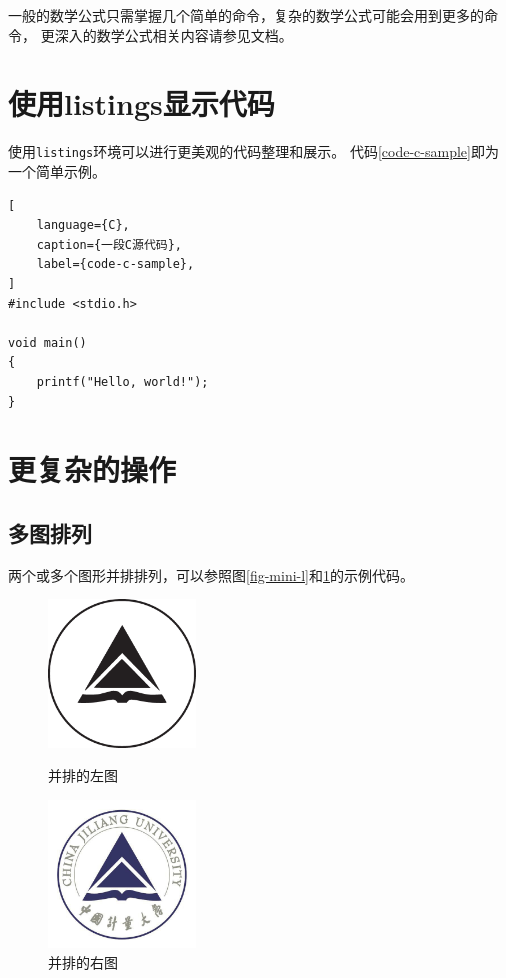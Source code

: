 一般的数学公式只需掌握几个简单的命令，复杂的数学公式可能会用到更多的命令，
更深入的数学公式相关内容请参见文档。

\section{使用listings显示代码}
\label{sec-listings}
使用\texttt{listings}环境可以进行更美观的代码整理和展示。
代码\ref{code-c-sample}即为一个简单示例。
\begin{lstlisting}[
    language={C},
    caption={一段C源代码},
    label={code-c-sample},
]
#include <stdio.h>

void main()
{
    printf("Hello, world!");
}
\end{lstlisting}

\section{更复杂的操作}
\label{sec-more}

\subsection{多图排列}
\label{subsec-multi-fig}
两个或多个图形并排排列，可以参照图\ref{fig-mini-l}和\ref{fig-mini-r}的示例代码。
\begin{figure}[h!] %
    \begin{minipage}{.5\textwidth} %
        \centering
        \includegraphics[width=0.35\textwidth]{preset/figure/logo.eps}
        \caption{并排的左图}
        \label{fig-mini-l}
    \end{minipage}
    \begin{minipage}{.5\textwidth}
        \centering
        \includegraphics[width=0.35\textwidth]{preset/figure/logo.jpg}
        \caption{并排的右图}
        \label{fig-mini-r}
    \end{minipage}
\end{figure}

